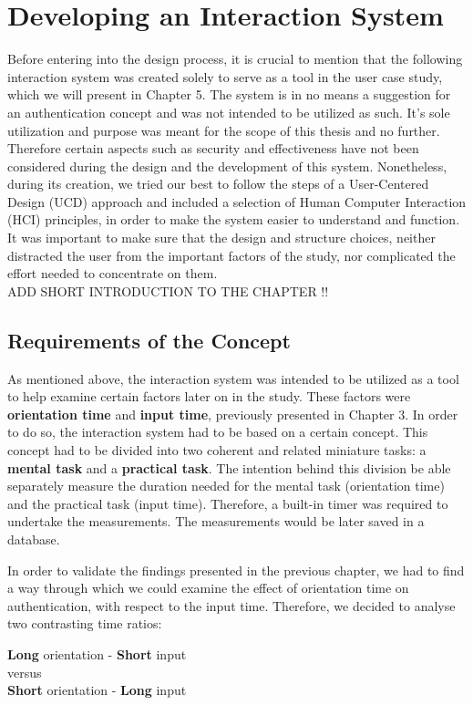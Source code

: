 
\chapter{Developing an Interaction System}\label{ch:forth}


Before entering into the design process, it is crucial to mention that the following interaction system was created solely to serve as a tool in the user case study, which we will present in Chapter 5. The system is in no means a suggestion for an authentication concept and was not intended to be utilized as such. It's sole utilization and purpose was meant for the scope of this thesis and no further. Therefore certain aspects such as security and effectiveness have not been considered during the design and the development of this system. Nonetheless, during its creation, we tried our best to follow the steps of a User-Centered Design (UCD) approach and included a selection of Human Computer Interaction (HCI) principles, in order to make the system easier to understand and function. It was important to make sure that the design and structure choices, neither distracted the user from the important factors of the study, nor complicated the effort needed to concentrate on them.  \\
ADD SHORT INTRODUCTION TO THE CHAPTER !!

\section{Requirements of the Concept}
As mentioned above, the interaction system was intended to be utilized as a tool to help examine certain factors later on in the study. These factors were \textbf{orientation time} and \textbf{input time}, previously presented in Chapter 3. In order to do so, the interaction system had to be based on a certain concept. This concept had to be divided into two coherent and related miniature tasks: a \textbf{mental task} and a \textbf{practical task}. The intention behind this division be able separately measure the duration needed for the mental task (orientation time) and the practical task (input time). Therefore, a built-in timer was required to undertake the measurements. The measurements would be later saved in a database. 

In order to validate the findings presented in the previous chapter, we had to find a way through which we could examine the effect of orientation time on authentication, with respect to the input time. Therefore, we decided to analyse two contrasting time ratios: 
\begin{center}
    \textbf{Long} orientation - \textbf{Short} input \\
    versus \\
    \textbf{Short} orientation - \textbf{Long} input
\end{center} 

